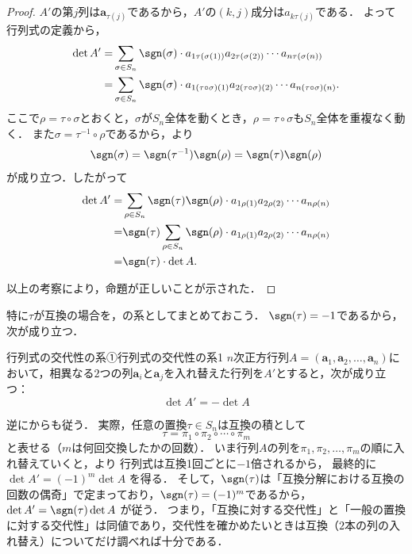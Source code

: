 \begin{tleftbar}
  \begin{proof}
    $A'$の第$j$列は$\bm{a}_{\tau(j)}$であるから，$A'$の$(k, j)$成分は$a_{k\tau(j)}$である．
    よって行列式の定義から，
    \begin{align*} 
      \det A ' = & \sum_{\sigma \in S_n} \sgn(\sigma) \cdot a_{1\tau(\sigma(1))} a_{2\tau(\sigma(2))} \dotsm a_{n\tau(\sigma(n))} \\
      = & \sum_{\sigma \in S_n} \sgn(\sigma) \cdot a_{1(\tau \circ \sigma)(1)} a_{2(\tau \circ \sigma)(2)} \dotsm a_{n(\tau \circ \sigma)(n)}.
    \end{align*} 
    ここで$\rho = \tau \circ \sigma$とおくと，$\sigma$が$S_n$全体を動くとき，$\rho = \tau \circ \sigma$も$S_n$全体を重複なく動く．
    また$\sigma = \tau^{-1} \circ \rho$であるから，より
    \[
      \sgn(\sigma) = \sgn(\tau^{-1}) \sgn(\rho) = \sgn(\tau) \sgn(\rho)
    \]
    が成り立つ．したがって
    \begin{align*} 
      \det A ' = & \sum_{\rho \in S_n} \sgn(\tau) \sgn(\rho) \cdot a_{1\rho(1)} a_{2\rho(2)} \dotsm a_{n\rho(n)} \\
      = & \sgn (\tau) \sum_{\rho \in S_n} \sgn(\rho) \cdot a_{1\rho(1)} a_{2\rho(2)} \dotsm a_{n\rho(n)} \\
      = & \sgn (\tau) \cdot \det A.
    \end{align*}

    以上の考察により，命題が正しいことが示された．
  \end{proof}
  \end{tleftbar}

  特に$\tau$が互換の場合を，の系としてまとめておこう．
  $\sgn(\tau) = -1$であるから，次が成り立つ．

  \begin{cor}{行列式の交代性の系①}{行列式の交代性の系1}
    $n$次正方行列$A = (\bm{a}_1, \bm{a}_2, \dots, \bm{a}_n)$において，相異なる$2$つの列$\bm{a}_i$と$\bm{a}_j$を入れ替えた行列を$A'$とすると，次が成り立つ：
    \[
    \det A' = - \det A
    \]
  \end{cor}

  逆にからも従う．
  実際，任意の置換$\tau\in S_n$は互換の積として
  \[
  \tau=\pi_1\circ\pi_2\circ\cdots\circ\pi_m
  \]
  と表せる（$m$は何回交換したかの回数）．
  いま行列$A$の列を$\pi_1,\pi_2,\dots,\pi_m$の順に入れ替えていくと，より
  行列式は互換1回ごとに$-1$倍されるから，
  最終的に $\det A' = (-1)^m \det A$ を得る．
  そして，$\sgn(\tau)$は「互換分解における互換の回数の偶奇」で定まっており，$\sgn(\tau)=(-1)^m$であるから，
  $\det A'=\sgn(\tau)\det A$ が従う．
  つまり，「互換に対する交代性」と「一般の置換に対する交代性」は同値であり，交代性を確かめたいときは互換（$2$本の列の入れ替え）についてだけ調べれば十分である．

